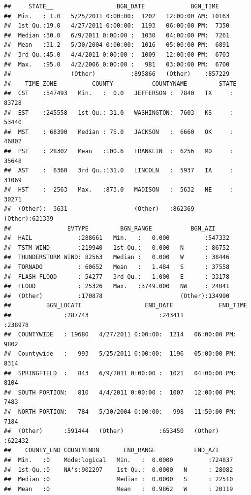 \documentclass[]{article}
\begin{document}
\begin{verbatim}
##     STATE__                  BGN_DATE             BGN_TIME     
##  Min.   : 1.0   5/25/2011 0:00:00:  1202   12:00:00 AM: 10163  
##  1st Qu.:19.0   4/27/2011 0:00:00:  1193   06:00:00 PM:  7350  
##  Median :30.0   6/9/2011 0:00:00 :  1030   04:00:00 PM:  7261  
##  Mean   :31.2   5/30/2004 0:00:00:  1016   05:00:00 PM:  6891  
##  3rd Qu.:45.0   4/4/2011 0:00:00 :  1009   12:00:00 PM:  6703  
##  Max.   :95.0   4/2/2006 0:00:00 :   981   03:00:00 PM:  6700  
##                 (Other)          :895866   (Other)    :857229  
##    TIME_ZONE          COUNTY           COUNTYNAME         STATE       
##  CST    :547493   Min.   :  0.0   JEFFERSON :  7840   TX     : 83728  
##  EST    :245558   1st Qu.: 31.0   WASHINGTON:  7603   KS     : 53440  
##  MST    : 68390   Median : 75.0   JACKSON   :  6660   OK     : 46802  
##  PST    : 28302   Mean   :100.6   FRANKLIN  :  6256   MO     : 35648  
##  AST    :  6360   3rd Qu.:131.0   LINCOLN   :  5937   IA     : 31069  
##  HST    :  2563   Max.   :873.0   MADISON   :  5632   NE     : 30271  
##  (Other):  3631                   (Other)   :862369   (Other):621339  
##                EVTYPE         BGN_RANGE           BGN_AZI      
##  HAIL             :288661   Min.   :   0.000          :547332  
##  TSTM WIND        :219940   1st Qu.:   0.000   N      : 86752  
##  THUNDERSTORM WIND: 82563   Median :   0.000   W      : 38446  
##  TORNADO          : 60652   Mean   :   1.484   S      : 37558  
##  FLASH FLOOD      : 54277   3rd Qu.:   1.000   E      : 33178  
##  FLOOD            : 25326   Max.   :3749.000   NW     : 24041  
##  (Other)          :170878                      (Other):134990  
##          BGN_LOCATI                  END_DATE             END_TIME     
##               :287743                    :243411              :238978  
##  COUNTYWIDE   : 19680   4/27/2011 0:00:00:  1214   06:00:00 PM:  9802  
##  Countywide   :   993   5/25/2011 0:00:00:  1196   05:00:00 PM:  8314  
##  SPRINGFIELD  :   843   6/9/2011 0:00:00 :  1021   04:00:00 PM:  8104  
##  SOUTH PORTION:   810   4/4/2011 0:00:00 :  1007   12:00:00 PM:  7483  
##  NORTH PORTION:   784   5/30/2004 0:00:00:   998   11:59:00 PM:  7184  
##  (Other)      :591444   (Other)          :653450   (Other)    :622432  
##    COUNTY_END COUNTYENDN       END_RANGE           END_AZI      
##  Min.   :0    Mode:logical   Min.   :  0.0000          :724837  
##  1st Qu.:0    NA's:902297    1st Qu.:  0.0000   N      : 28082  
##  Median :0                   Median :  0.0000   S      : 22510  
##  Mean   :0                   Mean   :  0.9862   W      : 20119  

\end{verbatim}
\end{document}
